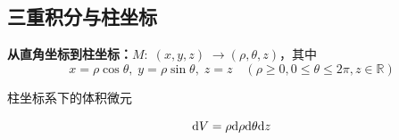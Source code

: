 \subsection{三重积分与柱坐标}

{\bf 从直角坐标到柱坐标：}$M:\;(x,y,z)\;\to(\rho,\theta,z)$，其中
$$x=\rho\cos\theta,\;y=\rho\sin\theta,\;z=z\quad (\rho\geq 0,0\leq\theta\leq
2\pi,z\in\mathbb{R})$$

\begin{center}
\end{center}

柱坐标系下的体积微元

\begin{center}
	$$\mathrm{d} V=\rho \mathrm{d}\rho \mathrm{d}\theta \mathrm{d} z$$
\end{center}

